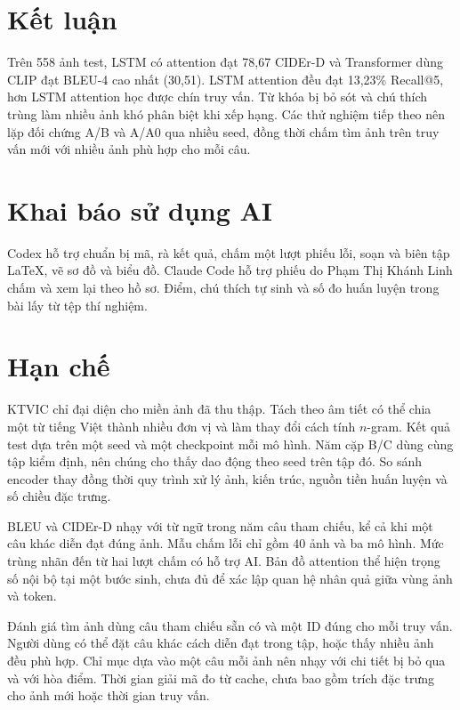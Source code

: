 \section{Kết luận}

Trên 558 ảnh test, LSTM có attention đạt 78,67 CIDEr-D và Transformer dùng CLIP đạt BLEU-4 cao nhất (30,51). LSTM attention đều đạt 13,23\% Recall@5, hơn LSTM attention học được chín truy vấn. Từ khóa bị bỏ sót và chú thích trùng làm nhiều ảnh khó phân biệt khi xếp hạng. Các thử nghiệm tiếp theo nên lặp đối chứng A/B và A/A0 qua nhiều seed, đồng thời chấm tìm ảnh trên truy vấn mới với nhiều ảnh phù hợp cho mỗi câu.

\section*{Khai báo sử dụng AI}

Codex hỗ trợ chuẩn bị mã, rà kết quả, chấm một lượt phiếu lỗi, soạn và biên tập LaTeX, vẽ sơ đồ và biểu đồ. Claude Code hỗ trợ phiếu do Phạm Thị Khánh Linh chấm và xem lại theo hồ sơ. Điểm, chú thích tự sinh và số đo huấn luyện trong bài lấy từ tệp thí nghiệm.

\raggedbottom
\section*{Hạn chế}

KTVIC chỉ đại diện cho miền ảnh đã thu thập. Tách theo âm tiết có thể chia một từ tiếng Việt thành nhiều đơn vị và làm thay đổi cách tính $n$-gram. Kết quả test dựa trên một seed và một checkpoint mỗi mô hình. Năm cặp B/C dùng cùng tập kiểm định, nên chúng cho thấy dao động theo seed trên tập đó. So sánh encoder thay đồng thời quy trình xử lý ảnh, kiến trúc, nguồn tiền huấn luyện và số chiều đặc trưng.

BLEU và CIDEr-D nhạy với từ ngữ trong năm câu tham chiếu, kể cả khi một câu khác diễn đạt đúng ảnh. Mẫu chấm lỗi chỉ gồm 40 ảnh và ba mô hình. Mức trùng nhãn đến từ hai lượt chấm có hỗ trợ AI. Bản đồ attention thể hiện trọng số nội bộ tại một bước sinh, chưa đủ để xác lập quan hệ nhân quả giữa vùng ảnh và token.

Đánh giá tìm ảnh dùng câu tham chiếu sẵn có và một ID đúng cho mỗi truy vấn. Người dùng có thể đặt câu khác cách diễn đạt trong tập, hoặc thấy nhiều ảnh đều phù hợp. Chỉ mục dựa vào một câu mỗi ảnh nên nhạy với chi tiết bị bỏ qua và với hòa điểm. Thời gian giải mã đo từ cache, chưa bao gồm trích đặc trưng cho ảnh mới hoặc thời gian truy vấn.

